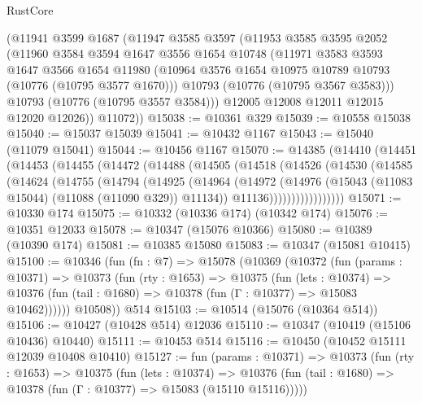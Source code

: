 \begin{lexlean}{RustCore}
\begin{coremodule}
      (@11941
        @3599
        @1687
        (@11947
          @3585
          @3597
          (@11953
            @3585
            @3595
            @2052
            (@11960
              @3584
              @3594
              @1647
              @3556
              @1654
              @10748
              (@11971
                @3583
                @3593
                @1647
                @3566
                @1654
                @11980
                (@10964 @3576 @1654 @10975 @10789 @10793 (@10776 (@10795 @3577 @1670)))
                @10793
                (@10776 (@10795 @3567 @3583)))
              @10793
              (@10776 (@10795 @3557 @3584)))
            @12005
            @12008
            @12011
            @12015
            @12020
            @12026))
        @11072))
@15038 := @10361 @329
@15039 := @10558 @15038
@15040 := @15037 @15039
@15041 := @10432 @1167
@15043 := @15040 (@11079 @15041)
@15044 := @10456 @1167
@15070 := @14385
    (@14410
      (@14451
        (@14453
          (@14455
            (@14472
              (@14488
                (@14505
                  (@14518
                    (@14526
                      (@14530
                        (@14585
                          (@14624
                            (@14755
                              (@14794
                                (@14925
                                  (@14964
                                    (@14972
                                      (@14976
                                        (@15043 (@11083 @15044) (@11088 (@11090 @329)) @11134))
                                      @11136)))))))))))))))))
@15071 := @10330 @174
@15075 := @10332 (@10336 @174) (@10342 @174)
@15076 := @10351 @12033
@15078 := @10347 (@15076 @10366)
@15080 := @10389 (@10390 @174)
@15081 := @10385 @15080
@15083 := @10347 (@15081 @10415)
@15100 := @10346
    (fun (fn : @7) =>
    @15078
      (@10369
        (@10372
          (fun (params : @10371) =>
          @10373
            (fun (rty : @1653) =>
            @10375
              (fun (lets : @10374) =>
              @10376 (fun (tail : @1680) => @10378 (fun (Γ : @10377) => @15083 @10462))))))
        @10508))
    @514
@15103 := @10514 (@15076 (@10364 @514))
@15106 := @10427 (@10428 @514) @12036
@15110 := @10347 (@10419 (@15106 @10436) @10440)
@15111 := @10453 @514
@15116 := @10450 (@10452 @15111 @12039 @10408 @10410)
@15127 := fun (params : @10371) =>
  @10373
    (fun (rty : @1653) =>
    @10375
      (fun (lets : @10374) =>
      @10376 (fun (tail : @1680) => @10378 (fun (Γ : @10377) => @15083 (@15110 @15116)))))

\end{coremodule}
\end{lexlean}
